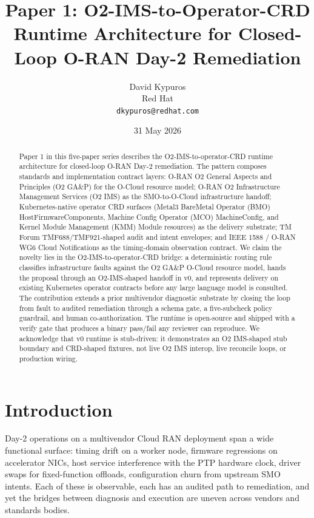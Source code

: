 \documentclass[twocolumn,10pt,a4paper]{article}
\title{Paper 1: O2-IMS-to-Operator-CRD Runtime Architecture for Closed-Loop O-RAN Day-2 Remediation}
\author{David Kypuros \\
\small Red Hat \\
\small \texttt{dkypuros@redhat.com}}
\date{31 May 2026}
\begin{document}
\maketitle

\begin{abstract}
Paper 1 in this five-paper series describes the O2-IMS-to-operator-CRD runtime architecture for closed-loop O-RAN Day-2 remediation. The pattern composes standards and implementation contract layers: O-RAN O2 General Aspects and Principles (O2 GA\&P) for the O-Cloud resource model; O-RAN O2 Infrastructure Management Services (O2 IMS) as the SMO-to-O-Cloud infrastructure handoff; Kubernetes-native operator CRD surfaces (Metal3 BareMetal Operator (BMO) HostFirmwareComponents, Machine Config Operator (MCO) MachineConfig, and Kernel Module Management (KMM) Module resources) as the delivery substrate; TM Forum TMF688/TMF921-shaped audit and intent envelopes; and IEEE 1588 / O-RAN WG6 Cloud Notifications as the timing-domain observation contract. We claim the novelty lies in the O2-IMS-to-operator-CRD bridge: a deterministic routing rule classifies infrastructure faults against the O2 GA\&P O-Cloud resource model, hands the proposal through an O2-IMS-shaped handoff in v0, and represents delivery on existing Kubernetes operator contracts before any large language model is consulted. The contribution extends a prior multivendor diagnostic substrate by closing the loop from fault to audited remediation through a schema gate, a five-subcheck policy guardrail, and human co-authorization. The runtime is open-source and shipped with a verify gate that produces a binary pass/fail any reviewer can reproduce. We acknowledge that v0 runtime is stub-driven: it demonstrates an O2 IMS-shaped stub boundary and CRD-shaped fixtures, not live O2 IMS interop, live reconcile loops, or production wiring.
\end{abstract}

\section{Introduction}

Day-2 operations on a multivendor Cloud RAN deployment span a wide functional surface: timing drift on a worker node, firmware regressions on accelerator NICs, host service interference with the PTP hardware clock, driver swaps for fixed-function offloads, configuration churn from upstream SMO intents. Each of these is observable, each has an audited path to remediation, and yet the bridges between diagnosis and execution are uneven across vendors and standards bodies.
\end{document}
